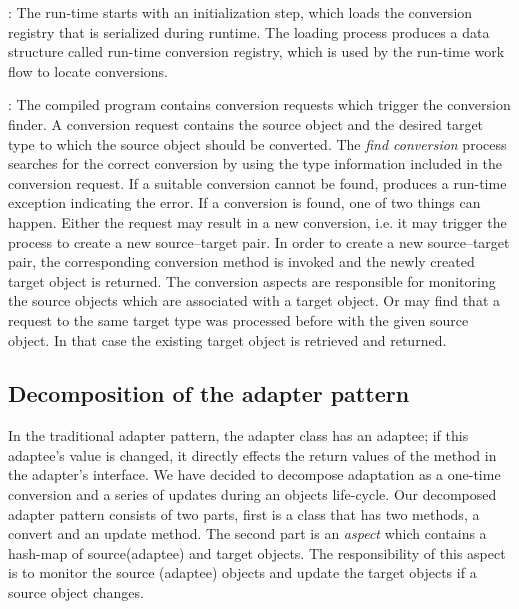 \begin{description}
\item{}: The \zamk run-time starts with an initialization step, which loads the conversion registry that is serialized during runtime. 
The loading process produces a data structure called run-time conversion registry, which is used by the run-time work flow to locate conversions.
\item{}: The compiled program contains \zamk conversion requests which trigger the conversion finder. 
A conversion request contains the source object and the desired target type to which the source object should be converted. 
The \emph{find conversion} process searches for the correct conversion by using the type information included in the conversion request. 
If a suitable conversion cannot be found, \zamk produces a run-time exception indicating the error. 
If a conversion is found, one of two things can happen. Either the request may result in a new conversion, i.e. it may trigger the process to create a new source--target pair. In order to create a new source--target pair, the corresponding conversion method is invoked and the newly created target object is returned. 
The conversion aspects are responsible for monitoring the source objects which are associated with a target object. Or \zamk may find that a request to the same target type was processed before with the given source object. In that case the existing target object is retrieved and returned. 
\end{description}









\subsection{Decomposition of the adapter pattern}
In the traditional adapter pattern, the adapter class has an adaptee; if this adaptee's value is changed, it directly effects the return values of the method in the adapter's interface.
We have decided to decompose adaptation as a one-time conversion and a series of updates during an objects life-cycle. 
Our decomposed adapter pattern consists of two parts, first is a class that has two methods, a convert and an update method. 
The second part is an \emph{aspect} which contains a hash-map of source(adaptee) and target objects. 
The responsibility of this aspect is to monitor the source (adaptee) objects and update the target objects if a source object changes.

